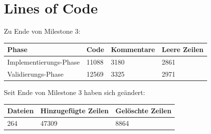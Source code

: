 \documentclass[10pt]{scrreprt}
\begin{document}
\chapter{Lines of Code}
Zu Ende von Milestone 3:
\begin{longtable}{|l|p{}|p{}|p{}|}
\hline
Phase & Code & Kommentare & Leere Zeilen\\
\hline
\hline
Implementierungs-Phase & 11088 & 3180 & 2861 \\
\hline
Validierungs-Phase & 12569 & 3325 & 2971 \\
\hline
\end{longtable}
\vspace{3mm}

Seit Ende von Milestone 3 haben sich geändert:
\begin{longtable}{|p{}|p{}|p{}|}
\hline
Dateien & Hinzugefügte Zeilen & Gelöschte Zeilen \\
\hline
\hline
264 & 47309 & 8864 \\
\hline
\end{longtable}
\end{document}
